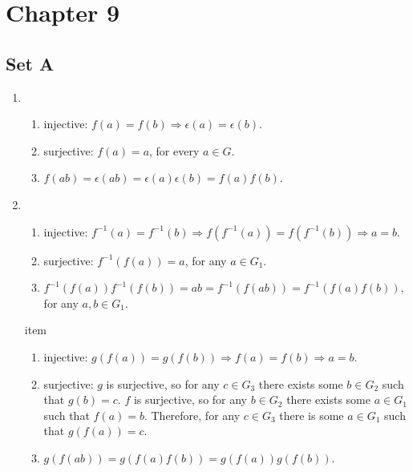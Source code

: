 \section{Chapter 9}
\subsection{Set A}
\begin{enumerate}
    \item
        \begin{enumerate}
            \item injective: $f(a) = f(b) \Rightarrow \epsilon(a) = \epsilon(b)$.
    
            \item surjective: $f(a) = a$, for every $a \in G$.
    
            \item $f(ab) = \epsilon(ab) = \epsilon(a)\epsilon(b) = f(a)f(b)$.
        \end{enumerate}
    
    \item
        \begin{enumerate}
            \item injective: $f^{-1}(a) = f^{-1}(b) \Rightarrow f(f^{-1}(a)) = f(f^{-1}(b)) \Rightarrow a = b$.
    
            \item surjective: $f^{-1}(f(a)) = a$, for any $a \in G_1$.
    
            \item $f^{-1}(f(a))f^{-1}(f(b)) = ab = f^{-1}(f(ab)) = f^{-1}(f(a)f(b))$, for any $a, b \in G_1$.
        \end{enumerate}
    item
        \begin{enumerate}
            \item injective: $ g(f(a)) = g(f(b)) \Rightarrow f(a) = f(b) \Rightarrow a = b $.
    
            \item surjective: $ g $ is surjective, so for any $ c \in G_3 $ there exists some $ b \in G_2 $ such that $ g(b) = c $. $ f $ is surjective, so for any $ b \in G_2 $ there exists some $ a \in G_1 $ such that $ f(a) = b $. Therefore, for any $ c \in G_3 $ there is some $ a \in G_1 $ such that $ g(f(a)) = c $.
    
            \item $ g(f(ab)) = g(f(a)f(b)) = g(f(a))g(f(b)) $.
        \end{enumerate}
\end{enumerate}

